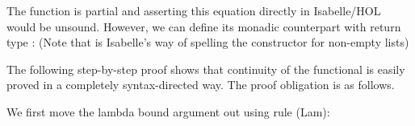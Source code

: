 \documentclass[copyright,creativecommons,sharealike]{eptcs}
\theoremstyle{remark}
\begin{document}
\begin{isabellebody}
\begin{isamarkuptext}
  \noindent
  The function is partial and asserting this equation directly in Isabelle/HOL would
  be unsound. However, we can define its monadic counterpart
  with return type : (Note that \isa{{\isacharhash}} is
  Isabelle's way of spelling the constructor for non-empty lists)
  \begin{quote}\parskip=0pt
  \end{quote}\end{isamarkuptext}\isamarkuptrue \isadelimproof
\endisadelimproof
\isatagproof
\begin{isamarkuptxt}The following step-by-step proof shows that continuity
of the functional is easily proved in a completely syntax-directed way.
The proof obligation is as follows.
  \begin{quote}\parskip=0pt\end{quote}
  We first move the lambda bound argument out using rule {\sc (Lam)}:\end{isamarkuptxt}\isamarkuptrue \begin{isamarkuptxt}\begin{quote}\parskip=0pt
\end{quote}
\end{isamarkuptxt}
\end{isabellebody}
\end{document}
